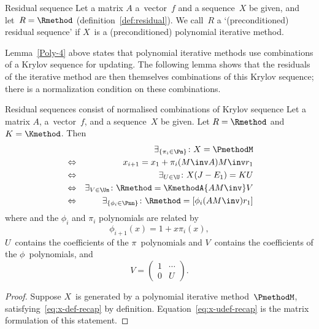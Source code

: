 \begin{precond}
\begin{ddefinition}{Residual sequence}
Let a matrix $A$ a~vector~$f$ and a sequence~$X$ be given, and
let~$R=\Rmethod$ (definition~\ref{def:residual}).  We call~$R$ a
`(preconditioned) residual sequence' if $X$~is a (preconditioned)
polynomial iterative method.
\end{ddefinition}

Lemma~\ref{Poly-4} above states that polynomial iterative methods use
combinations of a Krylov sequence for updating. The following lemma
shows that the residuals of the iterative method are then themselves
combinations of this Krylov sequence; there is a normalization
condition on these combinations.

\begin{llemma}{Residual sequences 
consist of normalised combinations of Krylov sequence}
\label{R-Krylov-combo}
Let a matrix $A$, a~vector~$f$, and a sequence~$X$ be given. 
Let $R=\Rmethod$ and $K=\Kmethod$. Then
\begin{eqnarray}
    &&\exists_{\{\pi_i\in\Pn\}}\colon X=\PmethodM \\
  &\Leftrightarrow&
    x_{i+1}=x_1+\pi_i(M\inv A)M\inv r_1
     \\ \label{eq:x-def-recap}
  &\Leftrightarrow&
    \exists_{U\in \U}\colon X(J-E_1)=KU
     \\ \label{eq:x-udef-recap}
  &\Leftrightarrow&
    \exists_{V\in \Un}\colon \Rmethod=\KmethodA{AM\inv}V
     \\\label{eq:R-norm-comb}
  &\Leftrightarrow&
    \exists_{\{\phi_i\in\Pnn\}}\colon\Rmethod=[\phi_i(AM\inv)r_1]
 \end{eqnarray}
where 
and the $\phi_i$ and $\pi_i$ polynomials are related by
\begin{equation} \phi_{i+1}(x)=1+x\pi_i(x),
    \label{eq:phi-pi-poly}
\end{equation}
$U$~contains the coefficients of the $\pi$~polynomials
and $V$~contains the coefficients of the $\phi$~polynomials,
and \[ V=\begin{pmatrix} 1&\cdots\\ 0&U \end{pmatrix}. \]
\end{llemma}

\begin{proof} Suppose $X$~is generated by a polynomial iterative
method~$\PmethodM$, satisfying~\ref{eq:x-def-recap} by definition.
%
Equation~\eqref{eq:x-udef-recap} is the matrix formulation of 
this statement.


\end{proof}
\end{precond}
